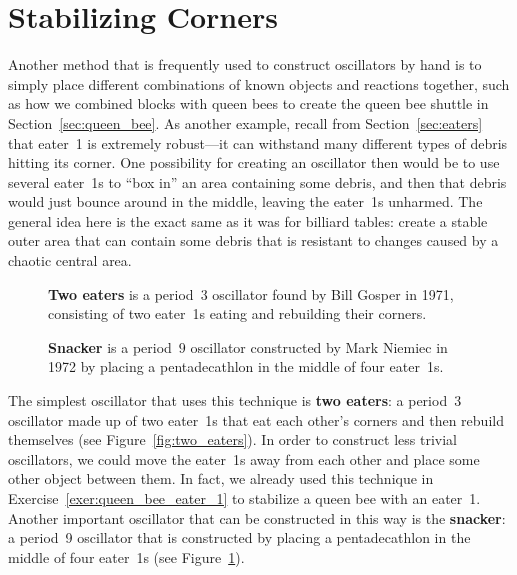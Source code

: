 \section{Stabilizing Corners}\label{sec:corner_oscillators}

Another method that is frequently used to construct oscillators by hand is to simply place different combinations of known objects and reactions together, such as how we combined blocks with queen bees to create the queen bee shuttle in Section~\ref{sec:queen_bee}. As another example, recall from Section~\ref{sec:eaters} that eater~1 is extremely robust---it can withstand many different types of debris hitting its corner. One possibility for creating an oscillator then would be to use several eater~1s to ``box in'' an area containing some debris, and then that debris would just bounce around in the middle, leaving the eater~1s unharmed. The general idea here is the exact same as it was for billiard tables: create a stable outer area that can contain some debris that is resistant to changes caused by a chaotic central area.

\begin{figure}[!htb]
	\centering
	\begin{minipage}{.48\textwidth}
		\centering
		\caption{\textbf{Two eaters} is a period~$3$ oscillator found by Bill Gosper in 1971, consisting of two eater~1s eating and rebuilding their corners.}\label{fig:two_eaters}
	\end{minipage} \hfill %
	\begin{minipage}{.48\textwidth}
		\centering
		\caption{\textbf{Snacker} is a period~$9$ oscillator constructed by Mark Niemiec in 1972 by placing a pentadecathlon in the middle of four eater~1s.}\label{fig:snacker}
	\end{minipage}
\end{figure}

The simplest oscillator that uses this technique is \textbf{two eaters}: a period~$3$ oscillator made up of two eater~1s that eat each other's corners and then rebuild themselves (see Figure~\ref{fig:two_eaters}). In order to construct less trivial oscillators, we could move the eater~1s away from each other and place some other object between them. In fact, we already used this technique in Exercise~\ref{exer:queen_bee_eater_1} to stabilize a queen bee with an eater~1. Another important oscillator that can be constructed in this way is the \textbf{snacker}: a period~9 oscillator that is constructed by placing a pentadecathlon in the middle of four eater~1s (see Figure~\ref{fig:snacker}).

